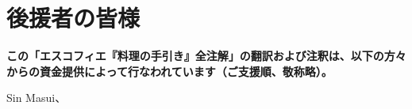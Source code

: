 \hypertarget{benefactors}{%
\section{後援者の皆様}\label{benefactors}}

\thispagestyle{empty}

\textbf{この「エスコフィエ『料理の手引き』全注解」の翻訳および注釈は、以下の方々からの資金提供によって行なわれています（ご支援順、敬称略）。}

Sin Masui、\href{20180524-23h,2x5000}{}
